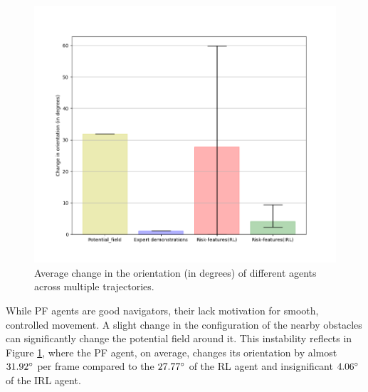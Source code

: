 \begin{figure}[htbp]
    \centering
    \includegraphics[width=0.7\linewidth]{plots/ucy_inter_method_new/compute_trajectory_smoothness_ucy_inter_method.png}
    \caption{Average change in the orientation (in degrees) of different agents across multiple trajectories.}
    \label{fig:inter_method-change_in_orientation_avg}
\end{figure}
While PF agents are good navigators, their lack motivation for smooth, controlled movement. A slight change in the configuration of the nearby obstacles can significantly change the potential field around it. This instability reflects in Figure \ref{fig:inter_method-change_in_orientation_avg}, where the PF agent, on average, changes its orientation by almost $31.92\degree$ per frame compared to the $27.77\degree$ of the RL agent and insignificant $4.06\degree$ of the IRL agent.


